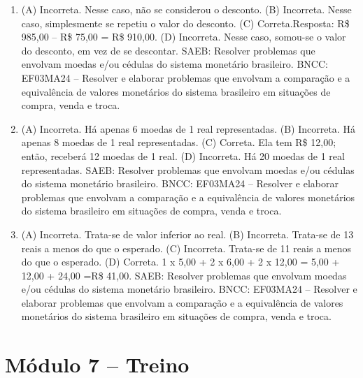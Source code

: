 \begin{enumerate}
\item
(A) Incorreta. Nesse caso, não se considerou o desconto.
(B) Incorreta. Nesse caso, simplesmente se repetiu o valor do desconto.
(C) Correta.Resposta: R\$ 985,00 -- R\$ 75,00 = R\$ 910,00.
(D) Incorreta. Nesse caso, somou-se o valor do desconto, em vez de se descontar.
SAEB: Resolver problemas que envolvam moedas e/ou cédulas do sistema monetário brasileiro. 
BNCC: EF03MA24 -- Resolver e elaborar problemas que envolvam a comparação e a equivalência de
valores monetários do sistema brasileiro em situações de compra, venda e troca.

\item
(A) Incorreta. Há apenas 6 moedas de 1 real representadas.
(B) Incorreta. Há apenas 8 moedas de 1 real representadas.
(C) Correta. Ela tem R\$ 12,00; então, receberá 12 moedas de 1 real.
(D) Incorreta. Há 20 moedas de 1 real representadas.
SAEB: Resolver problemas que envolvam moedas e/ou cédulas do sistema monetário brasileiro. 
BNCC: EF03MA24 -- Resolver e elaborar problemas que envolvam a comparação e a equivalência de
valores monetários do sistema brasileiro em situações de compra, venda e troca.

\item
(A) Incorreta. Trata-se de valor inferior ao real.
(B) Incorreta. Trata-se de 13 reais a menos do que o esperado.
(C) Incorreta. Trata-se de 11 reais a menos do que o esperado.
(D) Correta.
1 x 5,00 + 2 x 6,00 + 2 x 12,00 = 5,00 + 12,00 + 24,00 =R\$ 41,00.
SAEB: Resolver problemas que envolvam moedas e/ou cédulas do sistema monetário brasileiro. 
BNCC: EF03MA24 -- Resolver e elaborar problemas que envolvam a comparação e a equivalência de
valores monetários do sistema brasileiro em situações de compra, venda e troca.
\end{enumerate}

\section*{Módulo 7 -- Treino}

